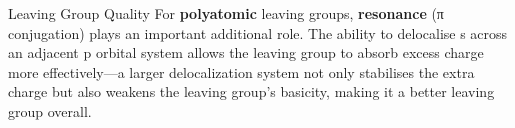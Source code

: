 \documentclass[10pt]{article}
\begin{document}
\begin{core}{Leaving Group Quality}
      For \textbf{polyatomic} leaving groups, \textbf{resonance} (π conjugation) plays an important additional role. The ability to delocalise s across an adjacent p orbital system allows the leaving group to absorb excess charge more effectively---a larger delocalization system not only stabilises the extra charge but also weakens the leaving group's basicity, making it a better leaving group overall.


    \end{core}
\end{document}
